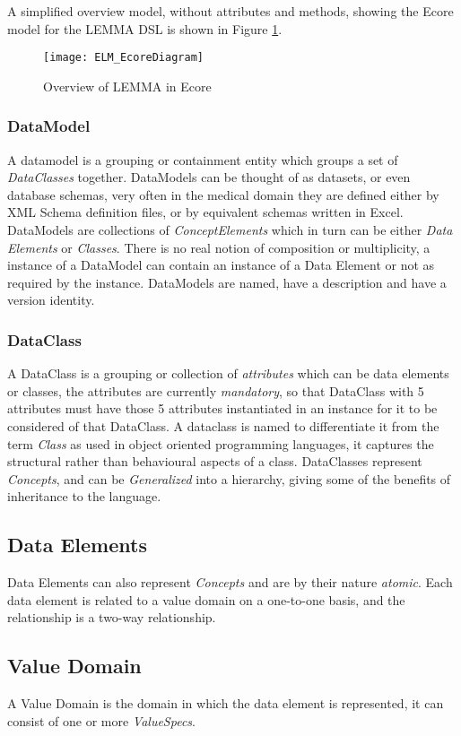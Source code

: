 A simplified overview model, without attributes and methods, showing the Ecore model for the LEMMA DSL is shown in Figure \ref{fig:mcSimplifiedOverview}.

\begin{figure}[here]
	\texttt{[image: ELM\_EcoreDiagram]}
	\caption{Overview of LEMMA in Ecore} 
	\label{fig:mcSimplifiedOverview}
\end{figure}

\subsubsection{DataModel}
A datamodel is a grouping or containment entity which groups a set of \emph{DataClasses} together. DataModels can be thought of as datasets, or even database schemas, very often in the medical domain they are defined either by XML Schema definition files, or by equivalent schemas written in Excel. 
DataModels are collections of \emph{ConceptElements} which in turn can be either \emph{Data Elements} or \emph{Classes}. There is no real notion of composition or multiplicity, a instance of a DataModel can contain an instance of a Data Element or not as required by the instance.  DataModels are named, have a description and have a version identity.
\subsubsection{DataClass}
A DataClass is a grouping or collection of \emph{attributes} which can be data elements or classes, the attributes are currently \emph{mandatory}, so that DataClass with 5 attributes must have those 5 attributes instantiated in an instance for it to be considered of that DataClass. A dataclass is named to differentiate it from the term \emph{Class} as used in object oriented programming languages, it captures the structural rather than behavioural aspects of a class.  DataClasses represent \emph{Concepts}, and can be \emph{Generalized} into a hierarchy, giving some of the benefits of inheritance to the language.  
\subsection{Data Elements} 
Data Elements can also represent \emph{Concepts} and are by their nature \emph{atomic}.  Each data element is related to a value domain on a one-to-one basis, and the relationship is a two-way relationship.
\subsection{Value Domain}
A Value Domain is the domain in which the data element is represented, it can consist of one or more \emph{ValueSpecs}.
